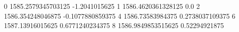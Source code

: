 0 1585.2579345703125 -1.2041015625
1 1586.4620361328125 0.0
2 1586.354248046875 -0.1077880859375
4 1586.73583984375 0.2738037109375
6 1587.13916015625 0.6771240234375
8 1586.9849853515625 0.52294921875
